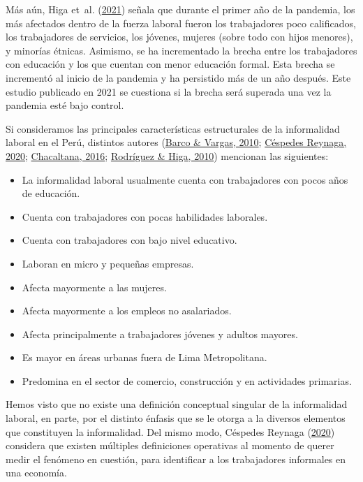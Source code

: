 \documentclass[
  letterpaper,
  12pt,
  oneside,
  spanish,
  doublespacing,
  headsepline,
  parskip]{MastersDoctoralThesis}
\begin{document}
Más aún, Higa et~al. (\protect\hyperlink{ref-higa2021}{2021}) señala que
durante el primer año de la pandemia, los más afectados dentro de la
fuerza laboral fueron los trabajadores poco calificados, los
trabajadores de servicios, los jóvenes, mujeres (sobre todo con hijos
menores), y minorías étnicas. Asimismo, se ha incrementado la brecha
entre los trabajadores con educación y los que cuentan con menor
educación formal. Esta brecha se incrementó al inicio de la pandemia y
ha persistido más de un año después. Este estudio publicado en 2021 se
cuestiona si la brecha será superada una vez la pandemia esté bajo
control.

Si consideramos las principales características estructurales de la
informalidad laboral en el Perú, distintos autores
(\protect\hyperlink{ref-barco2010}{Barco \& Vargas, 2010};
\protect\hyperlink{ref-cuxe9spedesreynaga2020}{Céspedes Reynaga, 2020};
\protect\hyperlink{ref-chacaltana2016}{Chacaltana, 2016};
\protect\hyperlink{ref-rodruxedguez2010}{Rodríguez \& Higa, 2010})
mencionan las siguientes:

\begin{itemize}
\item
  La informalidad laboral usualmente cuenta con trabajadores con pocos
  años de educación.
\item
  Cuenta con trabajadores con pocas habilidades laborales.
\item
  Cuenta con trabajadores con bajo nivel educativo.
\item
  Laboran en micro y pequeñas empresas.
\item
  Afecta mayormente a las mujeres.
\item
  Afecta mayormente a los empleos no asalariados.
\item
  Afecta principalmente a trabajadores jóvenes y adultos mayores.
\item
  Es mayor en áreas urbanas fuera de Lima Metropolitana.
\item
  Predomina en el sector de comercio, construcción y en actividades
  primarias.
\end{itemize}

Hemos visto que no existe una definición conceptual singular de la
informalidad laboral, en parte, por el distinto énfasis que se le otorga
a la diversos elementos que constituyen la informalidad. Del mismo modo,
Céspedes Reynaga (\protect\hyperlink{ref-cuxe9spedesreynaga2020}{2020})
considera que existen múltiples definiciones operativas al momento de
querer medir el fenómeno en cuestión, para identificar a los
trabajadores informales en una economía.
\end{document}

